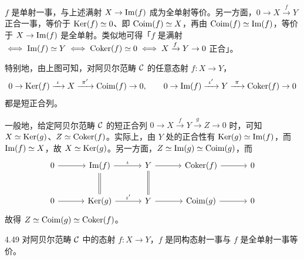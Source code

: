 $f$ 是单射一事，与上述满射 $X\to\operatorname{Im}(f)$ 成为全单射等价。另一方面，$0\to X\xrightarrow{f}Y$ 正合一事，等价于 $\operatorname{Ker}(f)\simeq 0$、即 $\operatorname{Coim}(f)\simeq X$，再由 $\operatorname{Coim}(f)\simeq\operatorname{Im}(f)$，等价于 $X\to\operatorname{Im}(f)$ 是全单射。类似地可得「$f$ 是满射 $\iff\operatorname{Im}(f)\simeq Y\iff\operatorname{Coker}(f)\simeq 0\iff X\xrightarrow{f}Y\to 0$ 正合」。

特别地，由上图可知，对阿贝尔范畴 $\mathcal{C}$ 的任意态射 $f\colon X\to Y$，
\[ 0\to\Ker(f)\xrightarrow{\ \iota\ }X\xrightarrow{\ \pi'\ }\Coim(f)\to 0,\qquad
   0\to\Img(f)\xrightarrow{\ \iota'\ }Y\xrightarrow{\ \pi\ }\Coker(f)\to 0 \]
都是短正合列。

一般地，给定阿贝尔范畴 $\mathcal{C}$ 的短正合列 $0\to X\xrightarrow{f}Y\xrightarrow{g}Z\to 0$ 时，可知 $X\simeq\operatorname{Ker}(g)$、$Z\simeq\operatorname{Coker}(f)$。实际上，由 $Y$ 处的正合性有 $\operatorname{Ker}(g)\simeq\operatorname{Im}(f)$，而 $\operatorname{Im}(f)\simeq X$，故 $X\simeq\operatorname{Ker}(g)$。另一方面，$Z\simeq\operatorname{Im}(g)\simeq\operatorname{Coim}(g)$，而
\[\begin{tikzcd}[row sep=2.6em, column sep=3.2em]
  0 \arrow[r] & \Img(f) \arrow[r,"\iota"] \arrow[d,equal] & Y \arrow[r] \arrow[d,equal] & \Coker(f) \arrow[r] & 0 \\
  0 \arrow[r] & \Ker(g) \arrow[r,"\iota'"] & Y \arrow[r] & \Coim(g) \arrow[r] & 0
\end{tikzcd}\]
故得 $Z\simeq\operatorname{Coim}(g)\simeq\operatorname{Coker}(f)$。

\begin{lemma}{4.49}
对阿贝尔范畴 $\mathcal{C}$ 中的态射 $f\colon X\to Y$，$f$ 是同构态射一事与 $f$ 是全单射一事等价。
\end{lemma}

